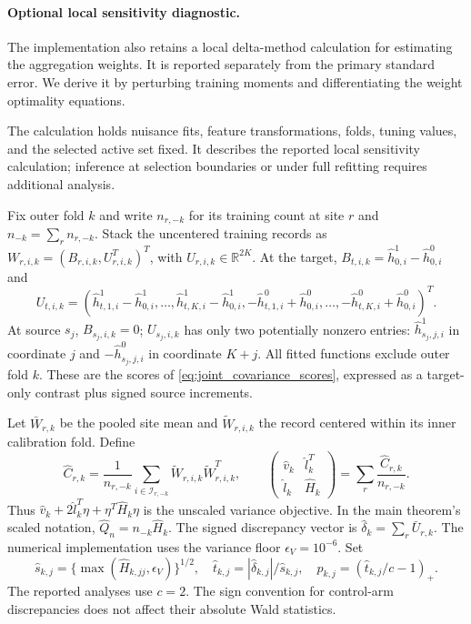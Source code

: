 \documentclass[12pt]{article}
\begin{document}
\paragraph{Optional local sensitivity diagnostic.} The implementation also retains a local delta-method calculation for estimating the aggregation weights. It is reported separately from the primary standard error. We derive it by perturbing training moments and differentiating the weight optimality equations.

The calculation holds nuisance fits, feature transformations, folds, tuning values, and the selected active set fixed. It describes the reported local sensitivity calculation; inference at selection boundaries or under full refitting requires additional analysis.

Fix outer fold $k$ and write $n_{r,-k}$ for its training count at site $r$ and $n_{-k}=\sum_r n_{r,-k}$. Stack the uncentered training records as $W_{r,i,k}=(B_{r,i,k},U_{r,i,k}^T)^T$, with $U_{r,i,k}\in\mathbb R^{2K}$. At the target, $B_{t,i,k}=\widehat h_{0,i}^1-\widehat h_{0,i}^0$ and
\[
U_{t,i,k}=(\widehat h_{t,1,i}^1-\widehat h_{0,i}^1,\ldots,
\widehat h_{t,K,i}^1-\widehat h_{0,i}^1,
-\widehat h_{t,1,i}^0+\widehat h_{0,i}^0,\ldots,
-\widehat h_{t,K,i}^0+\widehat h_{0,i}^0)^T.
\]
At source $s_j$, $B_{s_j,i,k}=0$; $U_{s_j,i,k}$ has only two potentially nonzero entries: $\widehat h_{s_j,j,i}^1$ in coordinate $j$ and $-\widehat h_{s_j,j,i}^0$ in coordinate $K+j$. All fitted functions exclude outer fold $k$. These are the scores of \cref{eq:joint_covariance_scores}, expressed as a target-only contrast plus signed source increments.

Let $\bar W_{r,k}$ be the pooled site mean and $\widetilde W_{r,i,k}$ the record centered within its inner calibration fold. Define
\[
\widehat C_{r,k}=\frac1{n_{r,-k}}\sum_{i\in\mathcal I_{r,-k}}
\widetilde W_{r,i,k}\widetilde W_{r,i,k}^T,
\qquad
\begin{pmatrix}\widehat v_k&\widehat l_k^T\\
\widehat l_k&\widehat H_k\end{pmatrix}
=\sum_r\frac{\widehat C_{r,k}}{n_{r,-k}}.
\]
Thus $\widehat v_k+2\widehat l_k^T\eta+\eta^T\widehat H_k\eta$ is the unscaled variance objective. In the main theorem's scaled notation, $\widehat Q_n=n_{-k}\widehat H_k$. The signed discrepancy vector is $\widehat\delta_k=\sum_r\bar U_{r,k}$. The numerical implementation uses the variance floor $\epsilon_V=10^{-6}$. Set
\[
\widehat s_{k,j}=\{\max(\widehat H_{k,jj},\epsilon_V)\}^{1/2},
\quad \widehat t_{k,j}=|\widehat\delta_{k,j}|/\widehat s_{k,j},
\quad p_{k,j}=(\widehat t_{k,j}/c-1)_+.
\]
The reported analyses use $c=2$. The sign convention for control-arm discrepancies does not affect their absolute Wald statistics.
\end{document}
